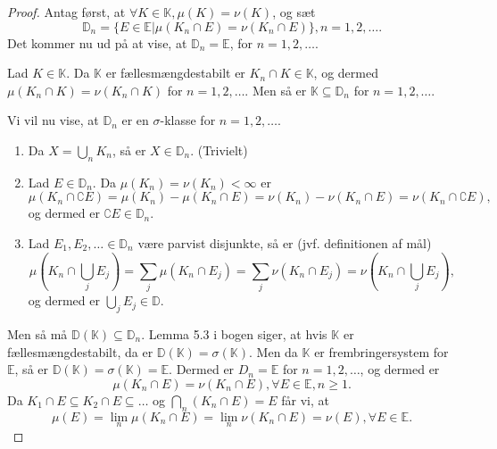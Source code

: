 \documentclass[12pt]{report}
\theoremstyle{break}
\newtheorem*{proof}{Bevis}
\theoremstyle{break}
\newcommand{\EE}{\mathbb{E}}
\newcommand{\K}{\mathbb{K}}
\newcommand{\D}{\mathbb{D}}
\begin{document}
\begin{proof}
Antag først, at $\forall K\in\K, \mu(K)=\nu(K)$, og sæt \[\D_n = \{E\in\EE\vert\mu(K_n\cap E)=\nu(K_n\cap E)\}, n=1,2,\ldots.\]
Det kommer nu ud på at vise, at $\D_n = \EE$, for $n=1,2,\ldots.$

\bigskip

\noindent Lad $K\in\K$. Da $\K$ er fællesmængdestabilt er $K_n\cap K\in\K$, og dermed $\mu(K_n\cap K)=\nu(K_n\cap K)$ for $n=1,2,\ldots$. Men så er $\K\subseteq\D_n$ for $n=1,2,\ldots$.

\bigskip

\noindent Vi vil nu vise, at $\D_n$ er en $\sigma$-klasse for $n=1,2,\ldots$.
\begin{enumerate}
\item Da $X=\bigcup_n K_n$, så er $X\in\D_n$. (Trivielt)
\item Lad $E\in\D_n$. Da $\mu(K_n)=\nu(K_n)<\infty$ er \[\mu ({K_n} \cap \complement E) = \mu ({K_n}) - \mu ({K_n} \cap E) = \nu ({K_n}) - \nu ({K_n} \cap E) = \nu ({K_n} \cap \complement E),\] og dermed er $\complement E\in\D_n$.
\item Lad $E_1, E_2,\ldots\in\D_n$ være parvist disjunkte, så er (jvf. definitionen af mål)
\[\mu ({K_n} \cap \bigcup\limits_j {{E_j}} ) = \sum\limits_j {\mu ({K_n} \cap {E_j})}  = \sum\limits_j {\nu ({K_n} \cap {E_j})}  = \nu ({K_n} \cap \bigcup\limits_j {{E_j}} ),\]
og dermed er $\bigcup_jE_j\in\D$.
\end{enumerate}
Men så må $\D(\K)\subseteq\D_n$. Lemma 5.3 i bogen siger, at hvis $\K$ er fællesmængdestabilt, da er $\D(\K)=\sigma(\K)$. Men da $\K$ er frembringersystem for $\EE$, så er $\D(\K)=\sigma(\K)=\EE$. Dermed er $D_n = \EE$ for $n=1,2,\ldots$, og dermed er 
\[\mu(K_n\cap E)=\nu(K_n\cap E), \forall E\in\EE, n\geq 1.\]
Da $K_1\cap E\subseteq K_2\cap E\subseteq\ldots$ og $\bigcap_n (K_n\cap E) = E$ får vi, at
\[\mu(E) = \lim_n\mu(K_n\cap E)=\lim_n\nu(K_n\cap E) = \nu(E), \forall E\in\EE.\]
\end{proof}

\newpage
\end{document}
